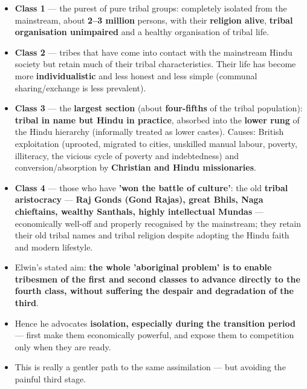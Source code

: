 \begin{KeyConcept}
\begin{itemize}
\item \textbf{Class 1} --- the purest of pure tribal groups: completely isolated from the mainstream, about \textbf{2--3 million} persons, with their \textbf{religion alive}, \textbf{tribal organisation unimpaired} and a healthy organisation of tribal life.
\item \textbf{Class 2} --- tribes that have come into contact with the mainstream Hindu society but retain much of their tribal characteristics. Their life has become more \textbf{individualistic} and less honest and less simple (communal sharing/exchange is less prevalent).
\item \textbf{Class 3} --- the \textbf{largest section} (about \textbf{four-fifths} of the tribal population): \textbf{tribal in name but Hindu in practice}, absorbed into the \textbf{lower rung} of the Hindu hierarchy (informally treated as lower castes). Causes: British exploitation (uprooted, migrated to cities, unskilled manual labour, poverty, illiteracy, the vicious cycle of poverty and indebtedness) and conversion/absorption by \textbf{Christian and Hindu missionaries}.
\item \textbf{Class 4} --- those who have \textbf{'won the battle of culture'}: the old \textbf{tribal aristocracy} --- \textbf{Raj Gonds (Gond Rajas), great Bhils, Naga chieftains, wealthy Santhals, highly intellectual Mundas} --- economically well-off and properly recognised by the mainstream; they retain their old tribal names and tribal religion despite adopting the Hindu faith and modern lifestyle.
\end{itemize}
\end{KeyConcept}

\begin{KeyConcept}
\begin{itemize}
\item Elwin's stated aim: \textbf{the whole 'aboriginal problem' is to enable tribesmen of the first and second classes to advance directly to the fourth class, without suffering the despair and degradation of the third}.
\item Hence he advocates \textbf{isolation, especially during the transition period} --- first make them economically powerful, and expose them to competition only when they are ready.
\item This is really a gentler path to the same assimilation --- but avoiding the painful third stage.
\end{itemize}
\end{KeyConcept}

